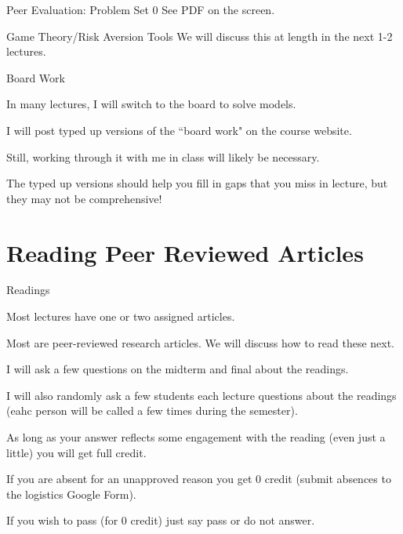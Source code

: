 \documentclass[aspectratio=169,usenames,dvipsnames]{beamer}
\newenvironment{wideitemize}{\itemize\addtolength{\itemsep}{10pt}}{\enditemize}
\begin{document}
\begin{frame}{Peer Evaluation: Problem Set 0}
\centering
    \huge See PDF on the screen.
\end{frame}


\begin{frame}{Game Theory/Risk Aversion Tools}
    \centering
    \huge We will discuss this at length in the next 1-2 lectures.
\end{frame}

\begin{frame}{Board Work}

\begin{wideitemize}
    \item In many lectures, I will switch to the board to solve models.
    \item I will post typed up versions of the ``board work" on the course website.
    \item Still, working through it with me in class will likely be necessary.
    \item The typed up versions should help you fill in gaps that you miss in lecture, but they may not be comprehensive!
\end{wideitemize}

\end{frame}

\section{Reading Peer Reviewed Articles}

\begin{frame}{Readings}
    \begin{wideitemize}
        \item Most lectures have one or two assigned articles.
        \item Most are peer-reviewed research articles. We will discuss how to read these next.
        \item I will ask a few questions on the midterm and final about the readings.
        \item I will also randomly ask a few students each lecture questions about the readings (eahc person will be called a few times during the semester).
        \item As long as your answer reflects some engagement with the reading (even just a little) you will get full credit.
        \item If you are absent for an unapproved reason you get 0 credit (submit absences to the logistics Google Form).
        \item If you wish to pass (for 0 credit) just say pass or do not answer. 
    \end{wideitemize}
    
\end{frame}
\end{document}
